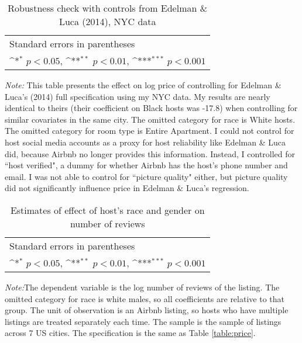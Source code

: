 \documentclass[11pt, oneside]{article}
\begin{document}
\begin{table}[htbp]\centering
	\def\sym#1{\ifmmode^{#1}\else\(^{#1}\)\fi}

	\caption{Robustness check with controls from Edelman \& Luca (2014), NYC data}
	\begin{tabular}{l*{1}{c}}
		\hline\hline
		 
		\hline\hline
		\multicolumn{2}{l}{\footnotesize Standard errors in parentheses}\\
		\multicolumn{2}{l}{\footnotesize \sym{*} \(p<0.05\), \sym{**} \(p<0.01\), \sym{***} \(p<0.001\)}\\
	\end{tabular}
	\begin{tablenotes}
				
		\item {\it Note:} This table presents the effect on log price of controlling for Edelman \& Luca's (2014) full specification using my NYC data. My results are nearly identical to theirs (their coefficient on Black hosts was -17.8) when controlling for similar covariates in the same city. The omitted category for race is White hosts. The omitted category for room type is Entire Apartment. I could not control for host social media accounts as a proxy for host reliability like Edelman \& Luca did, because Airbnb no longer provides this information. Instead, I controlled for ``host verified", a dummy for whether Airbnb has the host's phone number and email. I was not able to control for ``picture quality" either, but picture quality did not significantly influence price in Edelman \& Luca's regression.
	\end{tablenotes}
	
\end{table}

\begin{table}[htbp]\centering
	\def\sym#1{\ifmmode^{#1}\else\(^{#1}\)\fi}
	\caption{Estimates of effect of host’s race and gender on number of reviews}
	\begin{tabular}{l*{4}{c}}
		\hline\hline
		
		\hline\hline
		\multicolumn{5}{l}{\footnotesize Standard errors in parentheses}\\
		\multicolumn{5}{l}{\footnotesize \sym{*} \(p<0.05\), \sym{**} \(p<0.01\), \sym{***} \(p<0.001\)}\\
	\end{tabular}
	\begin{tablenotes}

		\item {\it Note:}The dependent variable is the log number of reviews of the listing. The omitted category for race is white males, so all coefficients are relative to that group. The unit of observation is an Airbnb listing, so hosts who have multiple listings are treated separately each time. The sample is the sample of listings across 7 US cities. The specification is the same as Table \ref{table:price}.	
	\end{tablenotes}
\end{table}
\end{document}
